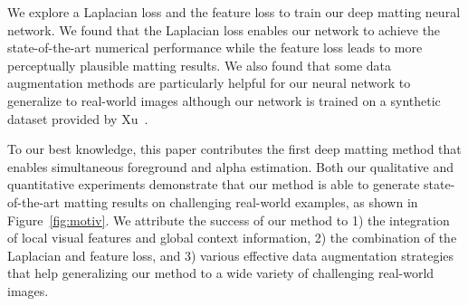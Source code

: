 \documentclass[10pt,twocolumn,letterpaper]{article}
\begin{document}
We explore a Laplacian loss and the feature loss to train our deep matting neural network. We found that the Laplacian loss enables our network to achieve the state-of-the-art numerical performance while the feature loss leads to more perceptually plausible matting results. We also found that some data augmentation methods are particularly helpful for our neural network to generalize to real-world images although our network is trained on a synthetic dataset provided by Xu~\etal\cite{xu2017deep}.

To our best knowledge, this paper contributes the first deep matting method that enables simultaneous foreground and alpha estimation. Both our qualitative and quantitative experiments demonstrate that our method is able to generate state-of-the-art matting results on challenging real-world examples, as shown in Figure~\ref{fig:motiv}. We attribute the success of our method to 1) the integration of local visual features and global context information, 2) the combination of the Laplacian and feature loss, and 3) various effective data augmentation strategies that help generalizing our method to a wide variety of challenging real-world images.
\end{document}
